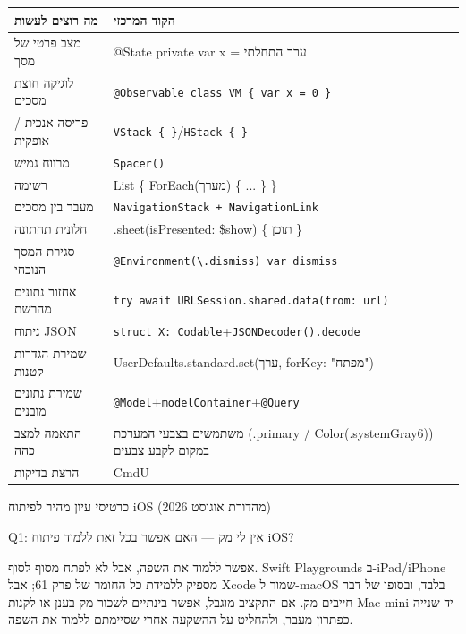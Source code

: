 


\begin{center}
\begin{tabularx}{\linewidth}{|X|X|}
\hline
\textbf{מה רוצים לעשות} & \textbf{הקוד המרכזי} \tabularnewline
\hline
מצב פרטי של מסך & @State private var x = ערך התחלתי \tabularnewline
לוגיקה חוצת מסכים & \texttt{@Observable class VM \{ var x = 0 \}} \tabularnewline
פריסה אנכית / אופקית & \texttt{VStack \{ \}}/\texttt{HStack \{ \}} \tabularnewline
מרווח גמיש & \texttt{Spacer()} \tabularnewline
רשימה & List \{ ForEach(מערך) \{ ... \} \} \tabularnewline
מעבר בין מסכים & \texttt{NavigationStack + NavigationLink} \tabularnewline
חלונית תחתונה & .sheet(isPresented: \$show) \{ תוכן \} \tabularnewline
סגירת המסך הנוכחי & \texttt{@Environment(\textbackslash{}.\allowbreak dismiss) var dismiss} \tabularnewline
אחזור נתונים מהרשת & \texttt{try await URLSession.\allowbreak shared.\allowbreak data(from: url)} \tabularnewline
ניתוח JSON & \texttt{struct X: Codable}+\texttt{JSONDecoder().\allowbreak decode} \tabularnewline
שמירת הגדרות קטנות & UserDefaults.standard.set(ערך, forKey: "מפתח") \tabularnewline
שמירת נתונים מובנים & \texttt{@Model}+\texttt{modelContainer}+\texttt{@Query} \tabularnewline
התאמה למצב כהה & משתמשים בצבעי המערכת (.primary / Color(.systemGray6)) במקום לקבע צבעים \tabularnewline
הרצת בדיקות & CmdU \tabularnewline
\hline
\end{tabularx}
\end{center}

\begin{center}\small\color{gray}כרטיסי עיון מהיר לפיתוח iOS (מהדורת אוגוסט 2026)\end{center}


Q1: אין לי מק — האם אפשר בכל זאת ללמוד פיתוח iOS?

אפשר ללמוד את השפה, אבל לא לפתח מסוף לסוף. Swift Playgrounds ב-iPad/iPhone מספיק ללמידת כל החומר של פרק 61; אבל Xcode שמור ל-macOS בלבד, ובסופו של דבר חייבים מק. אם התקציב מוגבל, אפשר בינתיים לשכור מק בענן או לקנות Mac mini יד שנייה כפתרון מעבר, ולהחליט על ההשקעה אחרי שסיימתם ללמוד את השפה.

